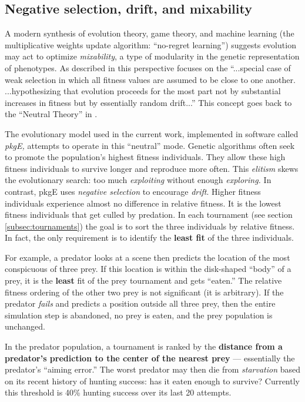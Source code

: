 \documentclass[acmtog]{acmart}
\newcommand{\jargon}[1]{\textit{#1}}
\newcommand{\lazypredator}[0]{pkgE}
\begin{document}
\subsection{Negative selection, drift, and mixability}

A modern synthesis \cite{livnat_sex_2016} of evolution theory, game theory, and machine learning (the multiplicative weights update algorithm: “no-regret learning”) suggests evolution may act to optimize \jargon{mixability}, a type of modularity in the genetic representation of phenotypes. As described in \citet{chastain_multiplicative_2013} this perspective focuses on the “...special case of weak selection in which all fitness values are assumed to be close to one another. ...hypothesizing that evolution proceeds for the most part not by substantial increases in fitness but by essentially random drift...” This concept goes back to the “Neutral Theory” in \citet{kimura_evolutionary_1968}.
\par
The evolutionary model used in the current work, implemented in software called \jargon{\lazypredator{},} attempts to operate in this “neutral” mode. Genetic algorithms often seek to promote the population's highest fitness individuals. They allow these high fitness individuals to survive longer and reproduce more often. This \jargon{elitism} skews the evolutionary search: too much \jargon{exploiting} without enough \jargon{exploring.}  In contrast, \lazypredator{} uses \textit{negative selection} to encourage \jargon{drift}. Higher fitness individuals experience almost no difference in  relative fitness. It is the lowest fitness individuals that get culled by predation. In each tournament (see section \ref{subsec:tournaments}) the goal is to sort the three individuals by relative fitness. In fact, the only requirement is to identify the \textbf{least fit} of the three individuals.
\par 
For example, a predator looks at a scene then predicts the location of the most conspicuous of three prey. If this location is within the disk-shaped “body” of a prey, it is the \textbf{least} fit of the prey tournament and gets “eaten.” The relative fitness ordering of the other two prey is not significant (it is arbitrary). If the predator \jargon{fails} and predicts a position outside all three prey, then the entire simulation step is abandoned, no prey is eaten, and the prey population is unchanged.
\par
In the predator population, a tournament is ranked by the \textbf{distance from a predator's prediction to the center of the nearest prey} — essentially the predator's “aiming error.” The worst predator may then die from \jargon{starvation} based on its recent history of hunting success: has it eaten enough to survive? Currently this threshold is 40\% hunting success over its last 20 attempts.
\end{document}
